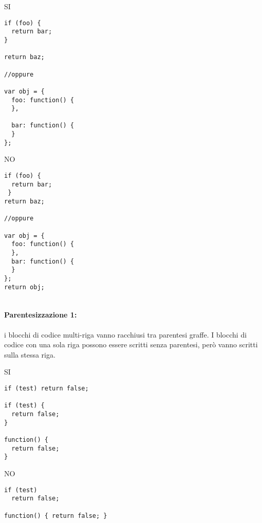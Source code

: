 \documentclass[../ProcessiPrimari.tex]{subfiles}
\begin{document}
\begin{center}{
\begin{minipage}{6cm}
	{\begin{center}SI\end{center}}
	\begin{Verbatim}[frame=single]
if (foo) {
  return bar;
}

return baz;
	
//oppure 
	
var obj = {
  foo: function() {
  },
	
  bar: function() {
  }
};
\end{Verbatim}
\end{minipage}
\hfil
\begin{minipage}{6cm}
	{\begin{center}NO\end{center}}
	\begin{Verbatim}[frame=single]
if (foo) {
  return bar;
 }
return baz;
	
//oppure
	
var obj = {
  foo: function() {
  },
  bar: function() {
  }
};
return obj;
	
	\end{Verbatim}
\end{minipage}
}
\end{center}
\paragraph{Parentesizzazione 1:} i blocchi di codice multi-riga vanno racchiusi tra parentesi
graffe. I blocchi di codice con una sola riga possono essere scritti senza parentesi, però vanno scritti sulla stessa riga.\\
\begin{center}{
\begin{minipage}{6.5cm}
{\begin{center}SI\end{center}}
\begin{Verbatim}[frame=single]
if (test) return false;

if (test) {
  return false;
}

function() {
  return false;
}
\end{Verbatim}
\end{minipage}
\hfil
\begin{minipage}{6.5cm}
	{\begin{center}NO\end{center}}
	\begin{Verbatim}[frame=single]
if (test)
  return false;
  
function() { return false; }




  
	\end{Verbatim}
\end{minipage}
}
\end{center}
\end{document}
